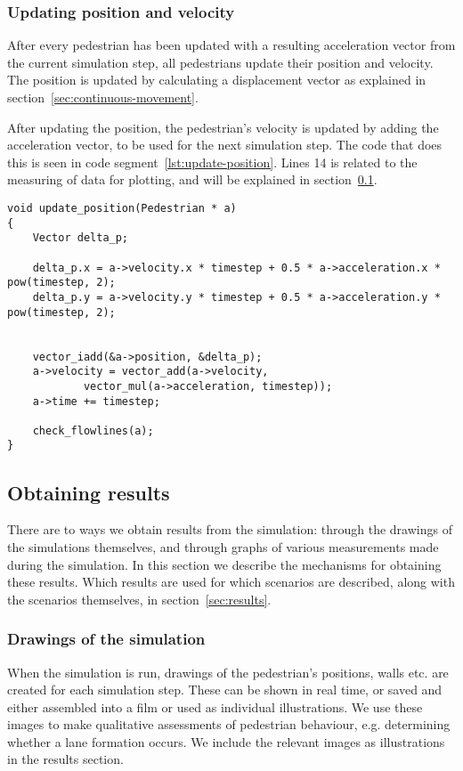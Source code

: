 \subsubsection{Updating position and velocity}
After every pedestrian has been updated with a resulting acceleration vector from 
the current simulation step, all pedestrians update their position and velocity.  
The position is updated by calculating a displacement vector as explained in 
section~\ref{sec:continuous-movement}.

After updating the position, the pedestrian's velocity is updated by adding 
the acceleration vector, to be used for the next simulation step. The code 
that does this is seen in code segment~\ref{lst:update-position}. Lines 14 is 
related to the measuring of data for plotting, and will be explained in 
section~\ref{sec:measurement}.

\begin{lstlisting}[caption={Updating the pedestrian 
    position.},label=lst:update-position]
void update_position(Pedestrian * a)
{
    Vector delta_p;

    delta_p.x = a->velocity.x * timestep + 0.5 * a->acceleration.x * pow(timestep, 2);
    delta_p.y = a->velocity.y * timestep + 0.5 * a->acceleration.y * pow(timestep, 2);


    vector_iadd(&a->position, &delta_p);
	a->velocity = vector_add(a->velocity,
			vector_mul(a->acceleration, timestep));
    a->time += timestep;

    check_flowlines(a);
}
\end{lstlisting}

\subsection{Obtaining results}
\label{sec:measurement}
There are to ways we obtain results from the simulation: through the drawings 
of the simulations themselves, and through graphs of various measurements made 
during the simulation. In this section we describe the mechanisms for 
obtaining these results. Which results are used for which scenarios are 
described, along with the scenarios themselves, in section~\ref{sec:results}.

\subsubsection{Drawings of the simulation}
When the simulation is run, drawings of the pedestrian's positions, walls etc. are 
created for each simulation step. These can be shown in real time, or saved 
and either assembled into a film or used as individual illustrations. We use 
these images to make qualitative assessments of pedestrian behaviour, e.g. 
determining whether a lane formation occurs. We include the relevant images as 
illustrations in the results section.

